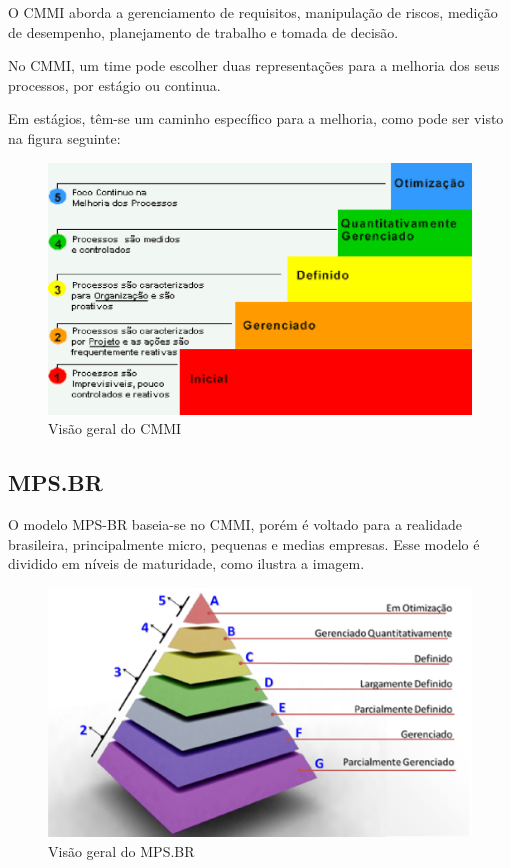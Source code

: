 O CMMI aborda a gerenciamento de requisitos, manipulação de riscos, medição de desempenho,
planejamento de trabalho e tomada de decisão.\cite{magno}

No CMMI, um time pode escolher duas representações para a melhoria dos seus processos,
por estágio ou continua.

Em estágios, têm-se um caminho específico para a melhoria, como pode ser visto na figura seguinte:

\begin{figure}[H]
    \centering
  \includegraphics[keepaspectratio=true,scale=0.7]{figuras/cmmi.eps}
    \caption{Visão geral do CMMI}
    \label{fig:cmmi}
\end{figure}

\subsection{MPS.BR}

O modelo MPS-BR baseia-se no CMMI,
porém é voltado para a realidade brasileira,
principalmente micro, pequenas e medias empresas.
Esse modelo é dividido em níveis de maturidade,
como ilustra a imagem.\cite{softex}

\begin{figure}[H]
    \centering
  \includegraphics[keepaspectratio=true,scale=0.7]{figuras/mpsbr.eps}
    \caption{Visão geral do MPS.BR}
    \label{fig:mps}
\end{figure}

